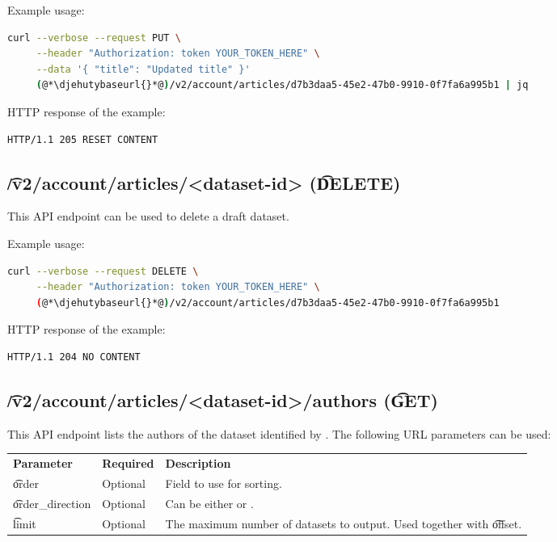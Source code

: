   Example usage:
\begin{lstlisting}[language=bash]
curl --verbose --request PUT \
     --header "Authorization: token YOUR_TOKEN_HERE" \
     --data '{ "title": "Updated title" }'
     (@*\djehutybaseurl{}*@)/v2/account/articles/d7b3daa5-45e2-47b0-9910-0f7fa6a995b1 | jq
\end{lstlisting}

  HTTP response of the example:
\begin{lstlisting}
HTTP/1.1 205 RESET CONTENT
\end{lstlisting}

\subsection{\t{/v2/account/articles/<dataset-id>} (\t{DELETE})}

  This API endpoint can be used to delete a draft dataset.

  Example usage:
\begin{lstlisting}[language=bash]
curl --verbose --request DELETE \
     --header "Authorization: token YOUR_TOKEN_HERE" \
     (@*\djehutybaseurl{}*@)/v2/account/articles/d7b3daa5-45e2-47b0-9910-0f7fa6a995b1
\end{lstlisting}

  HTTP response of the example:
\begin{lstlisting}
HTTP/1.1 204 NO CONTENT
\end{lstlisting}

\subsection{\t{/v2/account/articles/<dataset-id>/authors} (\t{GET})}
\label{sec:api-v2-articles-authors}

  This API endpoint lists the authors of the dataset identified by .
  The following URL parameters can be used:

\begin{tabularx}{\textwidth}{*{2}{!{\VRule[-1pt]}l}!{\VRule[-1pt]}X}
  \headrow
  \textbf{Parameter}   & \textbf{Required} & \textbf{Description}\\
  \t{order}            & Optional & Field to use for sorting.\\
  \t{order\_direction} & Optional & Can be either \code{asc} or .\\
  \t{limit}            & Optional & The maximum number of datasets to output.
                                    Used together with \t{offset}.
\end{tabularx}

